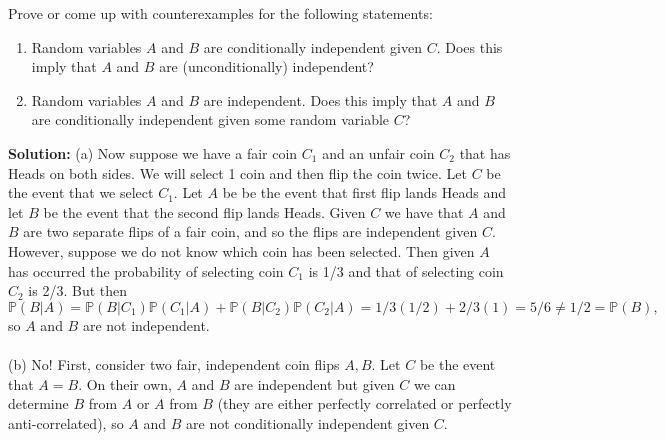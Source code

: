\documentclass{harvardml}
\theoremstyle{definition}
\theoremstyle{plain}
\begin{document}
		    
\begin{problem}
Prove or come up with counterexamples for the following statements:
    \begin{enumerate}[label=(\alph*)]
        \item  Random variables $A$ and $B$ are conditionally independent given $C$.  Does this imply that $A$ and $B$ are (unconditionally) independent?
        \item  Random variables $A$ and $B$ are independent.  Does this imply that $A$ and $B$ are conditionally independent given some random variable $C$?
    \end{enumerate}

\noindent \textbf{Solution:} 
(a) Now suppose we have a fair coin $C_1$ and an unfair coin $C_2$ that has Heads on both sides. We will select 1 coin and then flip the coin twice. Let $C$ be the event that we select $C_1$. Let $A$ be be the event that first flip lands Heads and let $B$ be the event that the second flip lands Heads. Given $C$ we have that $A$ and $B$ are two separate flips of a fair coin, and so the flips are independent given $C$. However, suppose we do not know which coin has been selected. Then given $A$ has occurred the probability of selecting coin $C_1$ is 1/3 and that of selecting coin $C_2$ is 2/3. But then $\mathbb P(B|A) = \mathbb P(B|C_1)\mathbb P(C_1|A) + \mathbb P(B|C_2)\mathbb P(C_2|A) = 1/3(1/2) + 2/3(1) = 5/6 \neq 1/2 = \mathbb P(B),$ so $A$ and $B$ are not independent.
\\
\\
(b) No! First, consider two fair, independent coin flips $A, B$. Let $C$ be the event that $A=B$. On their own, $A$ and $B$ are independent but given $C$ we can determine $B$ from $A$ or $A$ from $B$ (they are either perfectly correlated or perfectly anti-correlated), so $A$ and $B$ are not conditionally independent given $C$.
\end{problem}
		   
\end{document}
